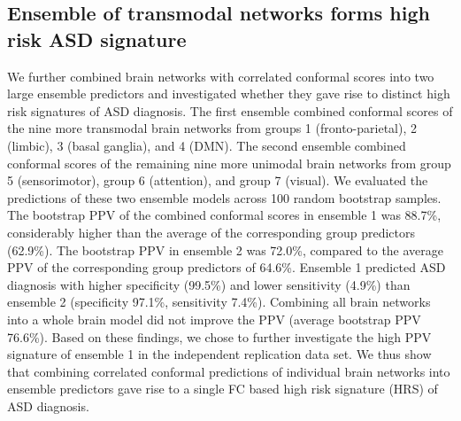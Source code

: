 \documentclass[9pt,lineno]{elife}
\begin{document}
\subsection{Ensemble of transmodal networks forms high risk ASD signature}
We further combined brain networks with correlated conformal scores into two large ensemble predictors and investigated whether they gave rise to distinct high risk signatures of ASD diagnosis. The first ensemble combined conformal scores of the nine more transmodal brain networks from groups 1 (fronto-parietal), 2 (limbic), 3 (basal ganglia), and 4 (DMN). The second ensemble combined conformal scores of the remaining nine more unimodal brain networks from group 5 (sensorimotor), group 6 (attention), and group 7 (visual). We evaluated the predictions of these two ensemble models across 100 random bootstrap samples. The bootstrap PPV of the combined conformal scores in ensemble 1 was 88.7\%, considerably higher than the average of the corresponding group predictors (62.9\%). The bootstrap PPV in ensemble 2 was 72.0\%, compared to the average PPV of the corresponding group predictors of 64.6\%. Ensemble 1 predicted ASD diagnosis with higher specificity (99.5\%) and lower sensitivity (4.9\%) than ensemble 2 (specificity 97.1\%, sensitivity 7.4\%). Combining all brain networks into a whole brain model did not improve the PPV (average bootstrap PPV 76.6\%). Based on these findings, we chose to further investigate the high PPV signature of ensemble 1 in the independent replication data set. We thus show that combining correlated conformal predictions of individual brain networks into ensemble predictors gave rise to a single FC based high risk signature (HRS) of ASD diagnosis.
\end{document}
